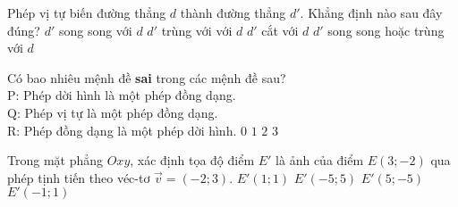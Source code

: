\begin{ex}%
	Phép vị tự biến đường thẳng $d$ thành đường thẳng $d'$. Khẳng định nào sau đây đúng?
	\choice
	{$d'$ song song với $d$}
	{$d'$ trùng với với $d$}
	{$d'$ cắt với $d$}
	{\True $d'$ song song hoặc trùng với $d$}
\end{ex}
\begin{ex}%
	Có bao nhiêu mệnh đề \textbf{sai} trong các mệnh đề sau?\\
	P: Phép dời hình là một phép đồng dạng. \\
	Q: Phép vị tự là một phép đồng dạng. \\
	R: Phép đồng dạng là một phép dời hình.
	\choicefix
	{$0$}
	{\True $1$}
	{$2$}
	{$3$}
\end{ex}
\begin{ex}%
	Trong mặt phẳng $Oxy$, xác định tọa độ điểm $E'$ là ảnh của điểm $E(3; -2)$ qua phép tịnh tiến theo véc-tơ $\vec{v} =(-2; 3)$.
	\choice
	{\True $E'(1; 1)$}
	{$E'(-5; 5)$}
	{$E'(5; -5)$}
	{$E'(-1; 1)$}
\end{ex}
